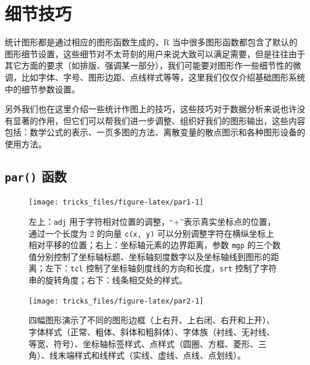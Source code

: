 \documentclass[
  b5paper,
  UTF8,twoside]{book}
\begin{document}
\hypertarget{cha:tricks}{%
\chapter{细节技巧}\label{cha:tricks}}

统计图形都是通过相应的图形函数生成的，R 当中很多图形函数都包含了默认的图形细节设置，这些细节对不太苛刻的用户来说大致可以满足需要，但是往往由于其它方面的要求（如排版、强调某一部分），我们可能要对图形作一些细节性的微调，比如字体、字号、图形边距、点线样式等等，这里我们仅仅介绍基础图形系统中的细节参数设置。

另外我们也在这里介绍一些统计作图上的技巧，这些技巧对于数据分析来说也许没有显著的作用，但它们可以帮我们进一步调整、组织好我们的图形输出，这些内容包括：数学公式的表示、一页多图的方法、离散变量的散点图示和各种图形设备的使用方法。

\hypertarget{sec:par}{%
\section{\texorpdfstring{\texttt{par()} 函数}{par() 函数}}\label{sec:par}}

\begin{figure}

{\centering \texttt{[image: tricks\_files/figure-latex/par1-1]} 

}

\caption[参数 \texttt{adj}、\texttt{mgp}、\texttt{tcl} 和 \texttt{ljoin} 设置演示]{左上：\texttt{adj} 用于字符相对位置的调整，``+''表示真实坐标点的位置，通过一个长度为 2 的向量 \texttt{c(x,\ y)} 可以分别调整字符在横纵坐标上相对平移的位置；右上：坐标轴元素的边界距离，参数 \texttt{mgp} 的三个数值分别控制了坐标轴标题、坐标轴刻度数字以及坐标轴线到图形的距离；左下：\texttt{tcl} 控制了坐标轴刻度线的方向和长度，\texttt{srt} 控制了字符串的旋转角度；右下：线条相交处的样式。}\label{fig:par1}
\end{figure}





\begin{figure}

{\centering \texttt{[image: tricks\_files/figure-latex/par2-1]} 

}

\caption[其它主要参数的效果演示：\texttt{bty}，\texttt{font}，\texttt{las}，\texttt{family} 等]{四幅图形演示了不同的图形边框（上右开、上右闭、右开和上开）、字体样式（正常、粗体、斜体和粗斜体）、字体族（衬线、无衬线、等宽、符号）、坐标轴标签样式、点样式（圆圈、方框、菱形、三角）、线末端样式和线样式（实线、虚线、点线、点划线）。}\label{fig:par2}
\end{figure}
\end{document}
